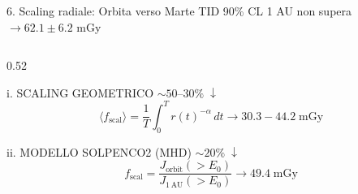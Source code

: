 \documentclass[aspectratio=169]{beamer}
\begin{document}

\begin{frame}{6. Scaling radiale: Orbita verso Marte}
\vspace{-0.2em}
TID 90\% CL 1 AU non supera$\longrightarrow 62.1\pm6.2$\; mGy
\hspace{6em}
\vspace{0.2em}

\begin{columns}[c]
    \begin{column}{0.52\textwidth}
       
        \vspace{0.2em}
        
        \begin{block}{\scriptsize i. SCALING GEOMETRICO \footnotesize{\textcolor{yellow!90!white} {$\sim 50$--$30\%\;\downarrow$}}}
            \small
            \vspace{-1.3em}
            \begin{equation*}
                \langle f_{\text{scal}} \rangle = \frac{1}{T} \int_0^{T} r(t)^{-\alpha}\,dt \longrightarrow 30.3-44.2\;\text{mGy}
            \end{equation*}
            \vspace{-0.8em}

            \vspace{-0.3em}
        \end{block}
        
        \vspace{0.2em}
        
        \begin{block}{\scriptsize ii. MODELLO SOLPENCO2 (MHD) \footnotesize{\textcolor{yellow!80!white}{$\sim 20\%\; \downarrow$}}}
            \small
            \vspace{-0.6em}
            \begin{equation*}
                f_{\text{scal}} = \frac{J_{\text{orbit}}(>E_0)}{J_{1\,\text{AU}}(>E_0)} \longrightarrow 49.4\;\text{mGy}
            \end{equation*}
            \vspace{-0.8em}
            
            \vspace{-0.3em}
        \end{block}
        
        \vspace{0.2em}
        

\end{column}
\end{columns}
\end{frame}
\end{document}
